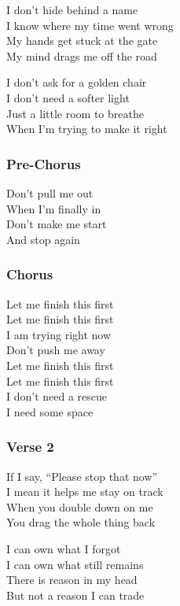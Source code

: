 I don't hide behind a name\\
I know where my time went wrong\\
My hands get stuck at the gate\\
My mind drags me off the road

I don't ask for a golden chair\\
I don't need a softer light\\
Just a little room to breathe\\
When I'm trying to make it right

\subsubsection{Pre-Chorus}\label{pre-chorus}

Don't pull me out\\
When I'm finally in\\
Don't make me start\\
And stop again

\subsubsection{Chorus}\label{chorus-6}

Let me finish this first\\
Let me finish this first\\
I am trying right now\\
Don't push me away\\
Let me finish this first\\
Let me finish this first\\
I don't need a rescue\\
I need some space

\subsubsection{Verse 2}\label{verse-2-4}

If I say, ``Please stop that now''\\
I mean it helps me stay on track\\
When you double down on me\\
You drag the whole thing back

I can own what I forgot\\
I can own what still remains\\
There is reason in my head\\
But not a reason I can trade

